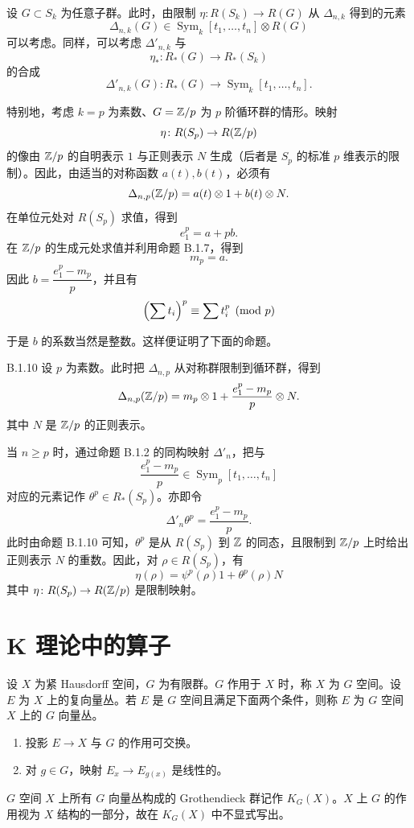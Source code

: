设 $G\subset S_k$ 为任意子群。此时，由限制 $\eta\colon R(S_k)\to R(G)$ 从 $\Delta_{n,k}$ 得到的元素
\[
\Delta_{n,k}(G)\in\operatorname{Sym}_k[t_1,\dots,t_n]\otimes R(G)
\]
可以考虑。同样，可以考虑 $\Delta'_{n,k}$ 与
\[
\eta_*\colon R_*(G)\to R_*(S_k)
\]
的合成
\[
\Delta'_{n,k}(G)\colon R_*(G)\to\operatorname{Sym}_k[t_1,\dots,t_n].
\]

特别地，考虑 $k=p$ 为素数、$G=\mathbb{Z}/p$ 为 $p$ 阶循环群的情形。映射
\[
\eta\colon R(S_p)\to R(\mathbb{Z}/p)
\]
的像由 $\mathbb{Z}/p$ 的自明表示 $1$ 与正则表示 $N$ 生成（后者是 $S_p$ 的标准 $p$ 维表示的限制）。因此，由适当的对称函数 $a(t),b(t)$，必须有
\[
\Delta_{n,p}(\mathbb{Z}/p)=a(t)\otimes1+b(t)\otimes N.
\]
在单位元处对 $R(S_p)$ 求值，得到
\[
e_1^p=a+pb.
\]
在 $\mathbb{Z}/p$ 的生成元处求值并利用命题 B.1.7，得到
\[
m_p=a.
\]
因此 $b=\dfrac{e_1^p-m_p}{p}$，并且有
\[
\Bigl(\sum t_i\Bigr)^p\equiv\sum t_i^p \pmod p
\]

于是 $b$ 的系数当然是整数。这样便证明了下面的命题。

\begin{proposition*}{B.1.10}
  设 $p$ 为素数。此时把 $\Delta_{n,p}$ 从对称群限制到循环群，得到
  \[
  \Delta_{n,p}(\mathbb{Z}/p)=m_p\otimes1+\frac{e_1^p-m_p}{p}\otimes N.
  \]
  其中 $N$ 是 $\mathbb{Z}/p$ 的正则表示。
\end{proposition*}

当 $n\ge p$ 时，通过命题 B.1.2 的同构映射 $\Delta'_n$，把与
\[
\frac{e_1^p-m_p}{p}\in\operatorname{Sym}_p[t_1,\dots,t_n]
\]
对应的元素记作 $\theta^p\in R_*(S_p)$。亦即令
\[
\Delta'_n\theta^p=\frac{e_1^p-m_p}{p}.
\]
此时由命题 B.1.10 可知，$\theta^p$ 是从 $R(S_p)$ 到 $\mathbb{Z}$ 的同态，且限制到 $\mathbb{Z}/p$ 上时给出正则表示 $N$ 的重数。因此，对 $\rho\in R(S_p)$，有
\begin{equation}
\eta(\rho)=\psi^p(\rho)1+\theta^p(\rho)N \tag{B.1.11}
\end{equation}
其中 $\eta\colon R(S_p)\to R(\mathbb{Z}/p)$ 是限制映射。

\section{K 理论中的算子}

设 $X$ 为紧 Hausdorff 空间，$G$ 为有限群。$G$ 作用于 $X$ 时，称 $X$ 为 $G$ 空间。设 $E$ 为 $X$ 上的复向量丛。若 $E$ 是 $G$ 空间且满足下面两个条件，则称 $E$ 为 $G$ 空间 $X$ 上的 $G$ 向量丛。
\begin{enumerate}[label=(\roman*),leftmargin=2.6em,itemsep=1pt]
\item 投影 $E\to X$ 与 $G$ 的作用可交换。
\item 对 $g\in G$，映射 $E_x\to E_{g(x)}$ 是线性的。
\end{enumerate}
$G$ 空间 $X$ 上所有 $G$ 向量丛构成的 Grothendieck 群记作 $K_G(X)$。$X$ 上 $G$ 的作用视为 $X$ 结构的一部分，故在 $K_G(X)$ 中不显式写出。

